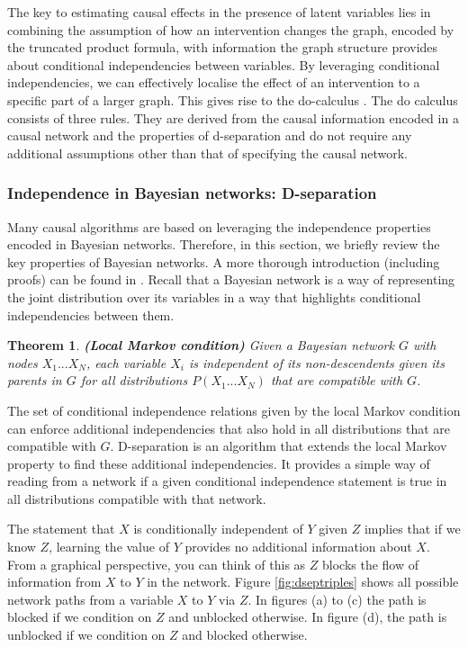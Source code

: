 \documentclass[11pt,a4paper,twoside]{report}
\theoremstyle{plain}
\newtheorem{theorem}{Theorem}
\theoremstyle{definition}
\begin{document}
The key to estimating causal effects in the presence of latent variables lies in combining the assumption of how an intervention changes the graph, encoded by the truncated product formula, with information the graph structure provides about conditional independencies between variables. 
By leveraging conditional independencies, we can effectively localise the effect of an intervention to a specific part of a larger graph. This gives rise to the do-calculus \citep{Pearl2000}. The do calculus consists of three rules. They are derived from the causal information encoded in a causal network and the properties of d-separation and do not require any additional assumptions other than that of specifying the causal network.

\subsubsection{Independence in Bayesian networks: D-separation}
\label{sec:dsep}

Many causal algorithms are based on leveraging the independence properties encoded in Bayesian networks. Therefore, in this section, we briefly review the key properties of Bayesian networks. A more thorough introduction (including proofs) can be found in \citep{Koller2009}. Recall that a Bayesian network is a way of representing the joint distribution over its variables in a way that highlights conditional independencies between them. 

\vspace{.3cm}
\begin{theorem}
\textbf{(Local Markov condition)} Given a Bayesian network $G$ with nodes $X_{1}...X_{N}$, each variable $X_{i}$ is independent of its non-descendents given its parents in $G$ for all distributions $P(X_{1}...X_{N})$ that are compatible with $G$.
\end{theorem}

The set of conditional independence relations given by the local Markov condition can enforce additional independencies that also hold in all distributions that are compatible with $G$. D-separation is an algorithm that extends the local Markov property to find these additional independencies. It provides a simple way of reading from a network if a given conditional independence statement is true in all distributions compatible with that network.

The statement that $X$ is conditionally independent of $Y$ given $Z$ implies that if we know $Z$, learning the value of $Y$ provides no additional information about $X$. From a graphical perspective, you can think of this as $Z$ blocks the flow of information from $X$ to $Y$ in the network. Figure \ref{fig:dseptriples} shows all possible network paths from a variable $X$ to $Y$ via $Z$. In figures (a) to (c) the path is blocked if we condition on $Z$ and unblocked otherwise. In figure (d), the path is unblocked if we condition on $Z$ and blocked otherwise. 
\end{document}
